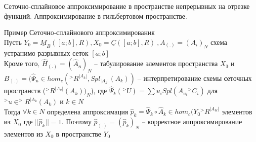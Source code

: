 \documentclass[__main__.tex]{subfiles}
\begin{document}
Сеточно-сплайновое аппроксимирование в пространстве непрерывных на отрезке функций. Аппроксимирование в гильбертовом пространстве.

Пример Сеточно-сплайнового аппроксимирования \\
Пусть $Y_0=\underline{M}_B([a;b],R),X_0=\underline{C}([a;b],R) \ ,A_{(.)}=(A_i)_N$ схема устранимо-разрывных сеток $[a;b]$\\
Кроме того, $\hat{H}_{(.)}=(\hat{A}_n)_N$ -- табулирование элементов пространства $X_0$ и \\ $B_{(.)}=(\hat{\Psi}_n\in hom_c(^>R^{|A_k|},Spl_{|A_k|}(A_k))$ -- интерпретирование схемы сеточных пространств ($^>R^{|A_k|}(A_k))_N$), где $\hat{\Psi}_k(^>U)=\sum u_i Spl(A_{u_i}{^>C}_i)	$ для $^>u\in ^>R^{|A_k}(A_k)$  и  $k\in N$\\
Тогда $\forall k\in N$ определена аппроксимация $\hat{p}_k=\hat{\Psi}_k \circ \hat{A}_k \in hom_c(Y_0{^>R}^{|A_K|}$ элементов из $X_0$	где $||\hat{p}_k||=1$. Поэтому $\hat{p}_{(.)}=(\hat{p}_k)_N$ -- корректное аппроксимирование элементов из $X_0$  в пространстве $Y_0$
\end{document}
